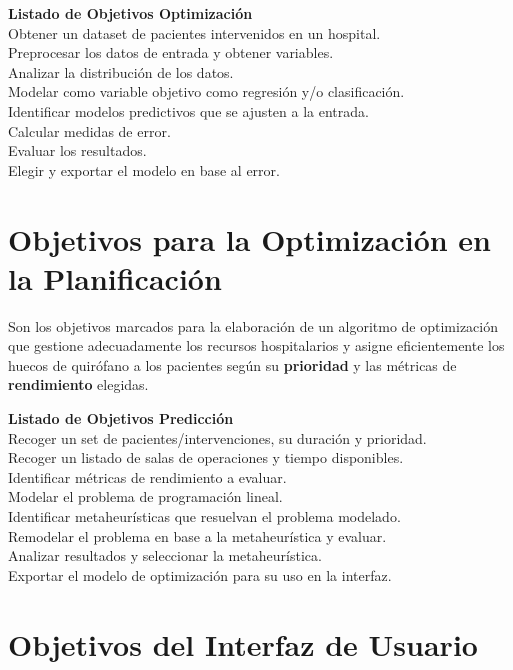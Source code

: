 {\textbf{Listado de Objetivos Optimización}\\}{ 
Obtener un dataset de pacientes intervenidos en un hospital. \\ 
 Preprocesar los datos de entrada y obtener variables. \\ 
 Analizar la distribución de los datos. \\
 Modelar como variable objetivo como regresión y/o clasificación.\\
 Identificar modelos predictivos que se ajusten a la entrada. \\ 
 Calcular medidas de error. \\
 Evaluar los resultados. \\
 Elegir y exportar el modelo en base al error. \\
 } 

\section{Objetivos para la Optimización en la Planificación}

Son los objetivos marcados para la elaboración de un algoritmo de optimización que gestione adecuadamente los recursos hospitalarios y asigne eficientemente los huecos de quirófano a los pacientes según su \textbf{prioridad} y las métricas de \textbf{rendimiento} elegidas.

{\textbf{Listado de Objetivos Predicción}\\}{ 
 Recoger un set de pacientes/intervenciones, su duración y prioridad. \\ 
 Recoger un listado de salas de operaciones y tiempo disponibles. \\ 
 Identificar métricas de rendimiento a evaluar. \\
 Modelar el problema de programación lineal.\\
 Identificar metaheurísticas que resuelvan el problema modelado. \\ 
 Remodelar el problema en base a la metaheurística y evaluar. \\
 Analizar resultados y seleccionar la metaheurística. \\
 Exportar el modelo de optimización para su uso en la interfaz. \\
 } 

\section{ Objetivos del Interfaz de Usuario}

